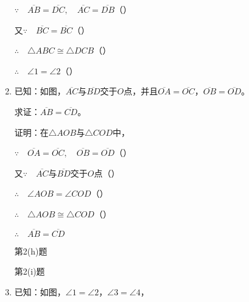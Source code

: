 \begin{Exercise}
\begin{question}
\begin{enumerate}
$\because\quad \overline{AB}=\overline{DC},\quad \overline{AC}=\overline{DB}$（\qquad ）

又$\because\quad \overline{BC}=\overline{BC}$（\qquad）

$\therefore\quad \triangle ABC\cong \triangle DCB$（\qquad）

$\therefore\quad \angle 1=\angle 2$（\qquad ）

\item 已知：如图，$\overline{AC}$与$\overline{BD}$交于$O$点，并且$\overline{OA}=\overline{OC}$，$\overline{OB}=\overline{OD}$。

求证：$\overline{AB}=\overline{CD}$。

证明：在$\triangle AOB$与$\triangle COD$中，

$\because\quad \overline{OA}=\overline{OC},\quad \overline{OB}=\overline{OD}$（\qquad）

又$\because\quad \overline{AC}$与$\overline{BD}$交于$O$点（\qquad）

$\therefore\quad \angle AOB=\angle COD$（\qquad）

$\therefore\quad \triangle AOB\cong\triangle COD$（\qquad）

$\therefore\quad \overline{AB}=\overline{CD}$

\begin{figurehere}
    \begin{minipage}[b]{0.48\linewidth}
    \centering
\begin{tikzpicture}[>=latex, scale=1]

    \end{tikzpicture}
    \caption*{第2(h)题}
    \end{minipage}
    \begin{minipage}[b]{0.48\linewidth}
    \centering
    \caption*{第2(i)题}
    \end{minipage}
    \end{figurehere}

\item 已知：如图，$\angle 1=\angle 2$，$\angle 3=\angle 4$，


\end{enumerate}
\end{question}
\end{Exercise}
